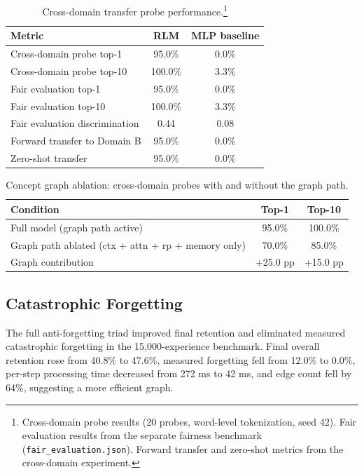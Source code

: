 \documentclass[11pt]{article}
\begin{document}
\begin{table}[h]
\centering
\caption{Cross-domain transfer probe performance.\footnote{Cross-domain probe results (20 probes, word-level tokenization, seed 42). Fair evaluation results from the separate fairness benchmark (\texttt{fair\_evaluation.json}). Forward transfer and zero-shot metrics from the cross-domain experiment.}}
\begin{tabular}{lcc}
\toprule
Metric & RLM & MLP baseline \\
\midrule
Cross-domain probe top-1 & 95.0\% & 0.0\% \\
Cross-domain probe top-10 & 100.0\% & 3.3\% \\
Fair evaluation top-1 & 95.0\% & 0.0\% \\
Fair evaluation top-10 & 100.0\% & 3.3\% \\
Fair evaluation discrimination & 0.44 & 0.08 \\
Forward transfer to Domain B & 95.0\% & 0.0\% \\
Zero-shot transfer & 95.0\% & 0.0\% \\
\bottomrule
\end{tabular}
\end{table}

\begin{table}[h]
\centering
\caption{Concept graph ablation: cross-domain probes with and without the graph path.}
\label{tab:ablation-graph}
\begin{tabular}{lcc}
\toprule
Condition & Top-1 & Top-10 \\
\midrule
Full model (graph path active) & 95.0\% & 100.0\% \\
Graph path ablated (ctx + attn + rp + memory only) & 70.0\% & 85.0\% \\
\midrule
Graph contribution & +25.0 pp & +15.0 pp \\
\bottomrule
\end{tabular}
\end{table}

\subsection{Catastrophic Forgetting}
The full anti-forgetting triad improved final retention and eliminated measured catastrophic forgetting in the 15,000-experience benchmark. Final overall retention rose from 40.8\% to 47.6\%, measured forgetting fell from 12.0\% to 0.0\%, per-step processing time decreased from 272 ms to 42 ms, and edge count fell by 64\%, suggesting a more efficient graph.
\end{document}
